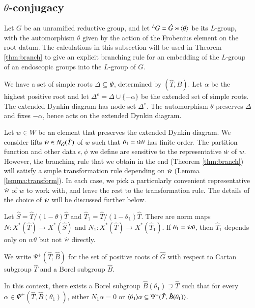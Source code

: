\subsection{$\theta$-conjugacy}

Let $G$ be an unramified reductive group, and let ${}^LG = \hat G
\rtimes \langle{\theta}\rangle$ be its $L$-group, with the automorphism $\theta$
given by the action of the Frobenius element on the root datum.  
The calculations in this subsection will be used in Theorem
\ref{thm:branch} to give an explicit branching rule for an embedding of
the $L$-group of an endoscopic groups into the $L$-group of $G$.

We have a  set of simple roots $\Delta\subseteq \Psi$, determined by $(\hat T,\hat
B)$.  Let $\alpha$ be the highest positive root and let $\Delta^e =
\Delta \cup \{-\alpha\}$ be the extended set of simple roots.  The
extended Dynkin diagram has node set $\Delta^e$.  The automorphism
$\theta$ preserves $\Delta$ and fixes $-\alpha$, hence acts on the
extended Dynkin diagram.

Let $w\in W$ be an element that preserves the extended Dynkin diagram.
We consider lifts $\dot w\in N_{\hat G}(\hat T)$ of $w$ such that
$\theta_1 = \dot w \theta$ has finite order.  The partition function
and other data $\epsilon,\phi$ we define are sensitive to the
representative $\dot w$ of $w$.  However, the branching rule that we
obtain in the end (Theorem \ref{thm:branch}) will satisfy a smple transformation
rule depending on $\dot w$ (Lemma \ref{lemma:transform}). 
In each case, we pick a particularly convenient representative $\dot w$
of $w$ to work with, and leave the rest to the transformation rule.  
The details of the choice of $\dot w$ will be
discussed further below.

Let $\hat S = \hat T/(1-\theta)\hat T$ and $\hat T_1 = \hat
T/(1-\theta_1)\hat T$.  There are norm maps $N:X^*(\hat T)\to X^*(\hat
S)$ and $N_1:X^*(\hat T)\to X^*(\hat T_1)$.  If $\theta_1 =\dot w\theta$,
then $\hat T_1$ depends only on $w\theta$ but not $\dot w$ directly.


We write $\Psi^+(\hat T,\hat B)$ for the set of positive roots of
$\hat G$ with respect to Cartan subgroup $\hat T$ and a Borel subgroup
$\hat B$.

\begin{lemma}\label{lemma:adapted}
  In this context, there exists a Borel subgroup $\hat
  B(\theta_1)\supseteq \hat T$ such that for every
  $\alpha\in\Psi^+(\hat T,\hat B(\theta_1))$, either $N_1\alpha = 0$
  or $\langle{\theta_1}\rangle\alpha\subseteq \Psi^+(\hat T,\hat B(\theta_1))$.
\end{lemma}

